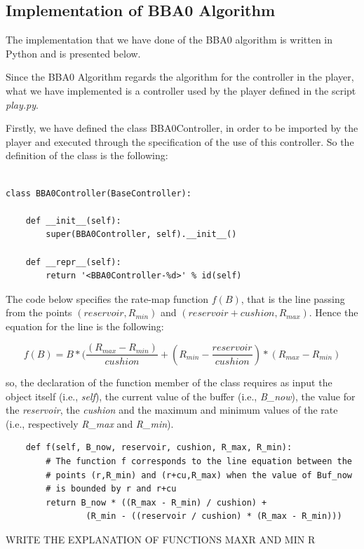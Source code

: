 \documentclass[a4paper]{report}
\begin{document}
\subsection{Implementation of BBA0 Algorithm}
The implementation that we have done of the BBA0 algorithm is written in Python and is presented below.

Since the BBA0 Algorithm regards the algorithm for the controller in the player, what we have implemented is a controller used by the player defined in the script \textit{play.py}.

Firstly, we have defined the class BBA0Controller, in order to be imported by the player and executed through the specification of the use of this controller. So the definition of the class is the following:
\begin{Verbatim}

class BBA0Controller(BaseController):

    def __init__(self):
        super(BBA0Controller, self).__init__()

    def __repr__(self):
        return '<BBA0Controller-%d>' % id(self)
\end{Verbatim}


The code below specifies the rate-map function $f(B)$, that is the line passing from the points $(reservoir, R_{min})$ and $(reservoir+cushion, R_{max})$. Hence the equation for the line is the following:

\[
f(B) = B *(\frac{(R_{max} - R_{min})}{cushion} + (R_{min} - \frac{reservoir}{cushion}) * (R_{max} - R_{min})
\]

so, the declaration of the function member of the class requires as input the object itself (i.e., \textit{self}), the current value of the buffer (i.e., \textit{B\_now}), the value for the \textit{reservoir}, the \textit{cushion} and the maximum and minimum values of the rate (i.e., respectively \textit{R\_max} and \textit{R\_min}).

\begin{Verbatim}
    def f(self, B_now, reservoir, cushion, R_max, R_min):
        # The function f corresponds to the line equation between the 
        # points (r,R_min) and (r+cu,R_max) when the value of Buf_now 
        # is bounded by r and r+cu
        return B_now * ((R_max - R_min) / cushion) + 
        		(R_min - ((reservoir / cushion) * (R_max - R_min)))
\end{Verbatim}

WRITE THE EXPLANATION OF FUNCTIONS MAXR AND MIN R
\end{document}
